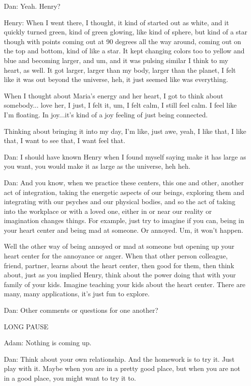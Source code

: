 \documentclass[12pt]{book}
\begin{document}
Dan: Yeah. Henry?
					
Henry: When I went there, I thought, it kind of started out as white, and it quickly turned green, kind of green glowing, like kind of sphere, but kind of a star though with points coming out at 90 degrees all the way around, coming out on the top and bottom, kind of like a star.
It kept changing colors too to yellow and blue and becoming larger, and um, and it was pulsing similar I think to my heart, as well.
It got larger, larger than my body, larger than the planet, I felt like it was out beyond the universe, heh, it just seemed like was everything.
					
When I thought about Maria's energy and her heart, I got to think about somebody... love her, I just, I felt it, um, I felt calm, I still feel calm. I feel like I’m floating. In joy...it’s kind of a joy feeling of just being connected.

Thinking about bringing it into my day, I'm like, just awe, yeah, I like that, I like that, I want to see that, I want feel that.



Dan: I should have known Henry when I found myself saying make it has large as you want,
you would make it as large as the universe, heh heh.


Dan: And you know, when we practice these centers, this one and other, another act of integration, taking the energetic aspects of our beings, exploring them and integrating with our psyches and our physical bodies, and so the act of taking into the workplace or with a loved one, either in or near our reality or imagination changes things. For example, just try to imagine if you can, being in your heart center and being mad at someone. Or annoyed. Um, it won't happen.
					
Well the other way of being annoyed or mad at someone but opening up your heart center for the annoyance or anger. When that other person colleague, friend, partner, learns about the heart center, then good for them, then think about, just as you implied Henry, think about the power doing that with your family of your kids. Imagine teaching your kids about the heart center. There are many, many applications, it’s just fun to explore.


Dan: Other comments or questions for one another?

LONG PAUSE

Adam: Nothing is coming up.

Dan: Think about your own relationship. And the homework is to try it. Just play with it. Maybe when you are in a pretty good place,
but when you are not in a good place, you might want to try it to.
\end{document}
